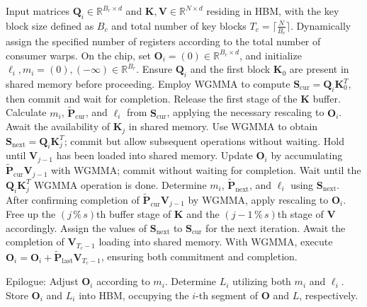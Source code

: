 \begin{algorithm}[H]
    \caption{\small\label{alg:flash3_wgmma}\textsc{FlashAttention-3} consumer warpgroup forward pass}
    \begin{algorithmic}[1]
      \REQUIRE  Input matrices $\mathbf{Q}_i \in \mathbb{R}^{B_r \times d}$ and $\mathbf{K}, \mathbf{V} \in \mathbb{R}^{N \times d}$ residing in HBM, with the key block size defined as $B_c$ and total number of key blocks $T_c = \lceil \frac{N}{B_c} \rceil$.
      \STATE Dynamically assign the specified number of registers according to the total number of consumer warps.
      \STATE On the chip, set $\mathbf{O}_i = (0) \in \mathbb{R}^{B_r \times d}$, and initialize $\ell_i, m_i = (0), (-\infty) \in \mathbb{R}^{B_r}$.
      \STATE Ensure $\mathbf{Q}_i$ and the first block $\mathbf{K}_0$ are present in shared memory before proceeding.
      \STATE Employ WGMMA to compute $\mathbf{S}_{\mathrm{cur}} = \mathbf{Q}_i \mathbf{K}_0^T$, then commit and wait for completion.
      \STATE Release the first stage of the $\mathbf{K}$ buffer.
      \STATE Calculate $m_{i}$, $\tilde{\mathbf{P}}_{\mathrm{cur}}$, and $\ell_{i}$ from $\mathbf{S}_{\mathrm{cur}}$, applying the necessary rescaling to $\mathbf{O}_i$.
        \STATE Await the availability of $\mathbf{K}_j$ in shared memory.
        \label{code:mainloop_start}
        \STATE Use WGMMA to obtain $\mathbf{S}_{\mathrm{next}} = \mathbf{Q}_i \mathbf{K}_{j}^T$; commit but allow subsequent operations without waiting. \label{code:first_wgmma}
        \STATE Hold until $\mathbf{V}_{j-1}$ has been loaded into shared memory.
        \STATE Update $\mathbf{O}_{i}$ by accumulating $\tilde{\mathbf{P}}_{\mathrm{cur}} \mathbf{V}_{j-1}$ with WGMMA; commit without waiting for completion. \label{code:second_wgmma}
        \STATE Wait until the $\mathbf{Q}_i \mathbf{K}_{j}^T$ WGMMA operation is done.
        \STATE Determine $m_{i}$, $\tilde{\mathbf{P}}_{\mathrm{next}}$, and $\ell_{i}$ using $\mathbf{S}_{\mathrm{next}}$. \label{code:softmax}
        \STATE After confirming completion of $\tilde{\mathbf{P}}_{\mathrm{cur}} \mathbf{V}_{j-1}$ by WGMMA, apply rescaling to $\mathbf{O}_i$.
        \STATE Free up the $(j\,\%\,s)$th buffer stage of $\mathbf{K}$ and the $(j-1\,\%\,s)$th stage of $\mathbf{V}$ accordingly.
        \STATE Assign the values of $\mathbf{S}_{\mathrm{next}}$ to $\mathbf{S}_{\mathrm{cur}}$ for the next iteration.
        \label{code:mainloop_end}
      \ENDFOR \STATE Await the completion of $\mathbf{V}_{T_c - 1}$ loading into shared memory.
      \STATE With WGMMA, execute
      $\mathbf{O}_{i} = \mathbf{O}_{i} + \tilde{\mathbf{P}}_{\mathrm{last}} \mathbf{V}_{T_c - 1}$, ensuring both commitment and completion.

\STATE Epilogue: Adjust $\mathbf{O}_{i}$ according to $m_{i}$. Determine $L_{i}$ utilizing both $m_{i}$ and $\ell_{i}$.  
Store $\mathbf{O}_{i}$ and $L_{i}$ into HBM, occupying the $i$-th segment of $\mathbf{O}$ and $L$, respectively.  
\end{algorithmic}
\end{algorithm}

